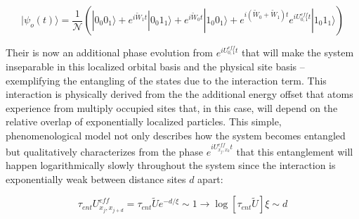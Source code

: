  \begin{equation}
 |\psi_o (t) \rangle = \frac{1}{\mathcal{N}} \left ( |0_0 0_1 \rangle +  e^{i \tilde{W}_1 t} |0_0 1_1 \rangle + e^{i \tilde{W}_0 t} |1_0 0_1 \rangle + e^{i \left ( \tilde{W}_0 + \tilde{W}_1 \right ) t} e^{i U_{0,1}^{eff} t}|1_0 1_1 \rangle \right )
 \label{eqn:mbl_time}
 \end{equation}

Their is now an additional phase evolution from $e^{i U_{0,1}^{eff} t}$ that will make the system inseparable in this localized orbital basis and the physical site basis -- exemplifying the entangling of the states due to the interaction term. This interaction is physically derived from the the additional energy offset that atoms experience from multiply occupied sites that, in this case, will depend on the relative overlap of exponentially localized particles. This simple, phenomenological model not only describes how the system becomes entangled but qualitatively characterizes from the phase $e^{i U_{x_j,x_k}^{eff} t}$ that this entanglement will happen logarithmically slowly throughout the system since the interaction is exponentially weak between distance sites $d$ apart:

\begin{equation}
\tau_{ent} U_{x_j,x_{j+d}}^{eff} = \tau_{ent} \tilde{U} e^{- d/ \xi} \sim 1 \rightarrow \log{ \left [ \tau_{ent} \tilde{U} \right ] } \xi \sim d 
\label{eqn:utime}
\end{equation}

